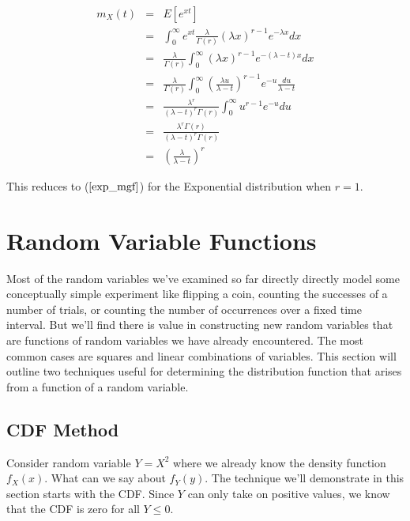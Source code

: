 \documentclass[]{article}
\begin{document}
\begin{eqnarray}
m_X(t) & = & E[e^{xt}] \\
   & = & \int_0^{\infty} e^{xt} \frac{\lambda}{\Gamma(r)} 
     (\lambda x)^{r-1} e^{- \lambda x} dx \nonumber \\
   &= & \frac{\lambda}{\Gamma(r)} \int_0^{\infty} (\lambda x)^{r-1}
    e^{-(\lambda - t)x} dx \nonumber \\
   & = & \frac{\lambda}{\Gamma(r)} \int_0^{\infty} 
        \left( \frac{\lambda u}{\lambda - t} \right)^{r-1}
        e^{-u} \frac{du}{\lambda - t} \nonumber \\
   & = & \frac{\lambda^r}{(\lambda - t)^r \Gamma(r)} \int_0^{\infty} 
        u^{r-1}  e^{-u} du \nonumber  \\
   & = & \frac{\lambda^r \Gamma(r)}{(\lambda - t)^r \Gamma(r)} \nonumber \\
   & = & \left( \frac{\lambda}{\lambda - t} \right)^r \label{gamma_mgf}
\end{eqnarray}

This reduces to ($\ref{exp_mgf}$) for the Exponential distribution
when $r=1$.


\section{Random Variable Functions}

Most of the random variables we've examined so far directly
directly model some conceptually simple experiment like
flipping a coin, counting the successes of a number of trials,
or counting the number of occurrences over a fixed time interval.
But we'll find there is value in constructing new random variables
that are functions of random variables we have already encountered.
The most common cases are squares and linear
combinations of variables.  This section will outline two
techniques useful for determining the distribution function
that arises from a function of a random variable.

\subsection{CDF Method}

Consider random variable $Y = X^2$ where we already know
the density function $f_X(x)$. What can we say about $f_Y(y)$.
The technique we'll demonstrate in this section starts with
the CDF.  Since $Y$ can only take on positive values, we know
that the CDF is zero for all $Y \le 0$.
\end{document}
